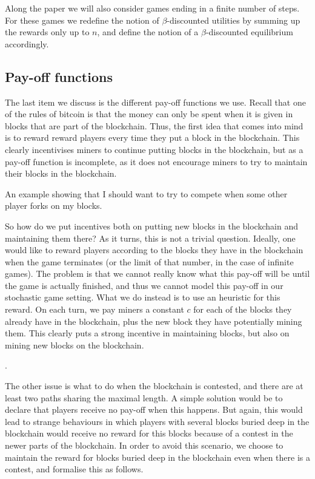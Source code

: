 Along the paper we will also consider games ending in a finite number of steps. For these games we redefine the notion of $\beta$-discounted utilities by summing up the rewards only up to $n$, and define the notion of a $\beta$-discounted equilibrium accordingly. 

\subsection{Pay-off functions}

The last item we discuss is the different pay-off functions we use. Recall that one of the rules of bitcoin is that the money can only 
be spent when it is given in blocks that are part of the blockchain. Thus, the first idea that comes into mind is to reward 
reward players every time they put a block in the blockchain. This clearly incentivises miners to continue putting blocks in the blockchain, 
but as a pay-off function is incomplete, as it does not encourage miners to try to maintain their blocks in the blockchain. 

\begin{myex} 
An example showing that I should want to try to compete when some other player forks on my blocks. 
\end{myex} 

So how do we put incentives both on putting new blocks in the blockchain and maintaining them there? As it turns, this is not a trivial question. Ideally, one would like to reward players according to the blocks they have in the blockchain when the game terminates (or the limit of that number, in the case of infinite games). The problem is that we cannot really know what this pay-off will be until the game is actually finished, and thus we cannot model this pay-off in our stochastic game setting. 
What we do instead is to use an heuristic for this reward. On each turn, we pay miners a constant $c$ for each of the blocks they already have in the blockchain, plus the new block they have potentially mining them. This clearly puts a strong incentive in maintaining blocks, but also on mining new blocks on the blockchain. 

.

The other issue is what to do when the blockchain is contested, and there are at least two paths sharing the maximal length. A simple solution 
would be to declare that players receive no pay-off when this happens. But again, this would lead to strange behaviours in which players with several blocks buried deep in the blockchain would receive no reward for this blocks because of a contest in the newer parts of the blockchain. 
In order to avoid this scenario, we choose to maintain the reward for blocks buried deep in the blockchain even when there is a contest, 
and formalise this as follows. 


